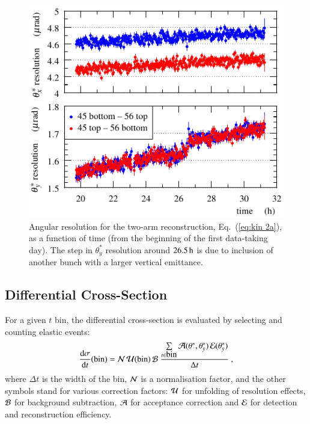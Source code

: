 \begin{figure}
\begin{center}
\includegraphics{fig/resolutions_vs_time.pdf}
\vskip-4mm
\caption{%
Angular resolution for the two-arm reconstruction, Eq.~(\ref{eq:kin 2a}), as a function of time (from the beginning of the first data-taking day). The step in $\theta_y^*$ resolution around $26.5\,{\rm h}$ is due to inclusion of another bunch with a larger vertical emittance.
}
\label{fig:resolutions}
\end{center}
\end{figure}





\subsection{Differential Cross-Section}
\label{sec:diff cs}

For a given $t$ bin, the differential cross-section is evaluated by selecting and counting elastic events:
\begin{equation}
{\d\sigma\over \d t}(\hbox{bin}) =
	{\cal N}\, {\cal U}({\rm bin})\, {\cal B}\ 
	{\sum\limits_{t \in \hbox{bin}} {\cal A}(\theta^*, \theta_y^*)\, {\cal E}(\theta_y^*)\over \Delta t}\ ,
\end{equation}
where $\Delta t$ is the width of the bin, ${\cal N}$ is a normalisation factor, 
and the other symbols stand for various correction factors:
${\cal U}$ for unfolding of resolution effects, ${\cal B}$ for background subtraction, ${\cal A}$ for acceptance correction and ${\cal E}$ for detection and reconstruction efficiency.

